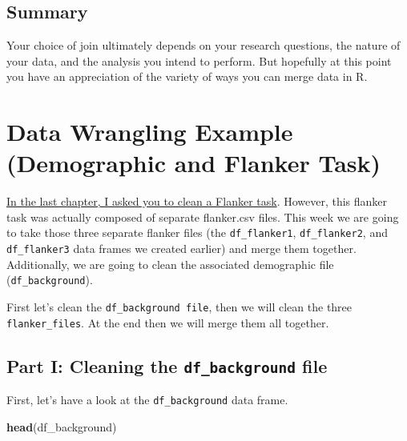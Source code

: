 \documentclass[
]{book}
\newenvironment{Shaded}{\begin{snugshade}}{\end{snugshade}}
\newcommand{\FunctionTok}[1]{\textcolor[rgb]{0.13,0.29,0.53}{\textbf{#1}}}
\newcommand{\NormalTok}[1]{#1}
\begin{document}
\hypertarget{summary-7}{%
\subsection{Summary}\label{summary-7}}

Your choice of join ultimately depends on your research questions, the nature of your data, and the analysis you intend to perform. But hopefully at this point you have an appreciation of the variety of ways you can merge data in R.

\hypertarget{data-wrangling-example-demographic-and-flanker-task}{%
\section{Data Wrangling Example (Demographic and Flanker Task)}\label{data-wrangling-example-demographic-and-flanker-task}}

\protect\hyperlink{clean-activity}{In the last chapter, I asked you to clean a Flanker task}. However, this flanker task was actually composed of separate flanker.csv files. This week we are going to take those three separate flanker files (the \texttt{df\_flanker1}, \texttt{df\_flanker2}, and \texttt{df\_flanker3} data frames we created earlier) and merge them together. Additionally, we are going to clean the associated demographic file (\texttt{df\_background}).

First let's clean the \texttt{df\_background\ file}, then we will clean the three \texttt{flanker\_files}. At the end then we will merge them all together.

\hypertarget{part-i-cleaning-the-df_background-file}{%
\subsection{\texorpdfstring{Part I: Cleaning the \texttt{df\_background} file}{Part I: Cleaning the df\_background file}}\label{part-i-cleaning-the-df_background-file}}

First, let's have a look at the \texttt{df\_background} data frame.

\begin{Shaded}
\begin{Highlighting}[]
\FunctionTok{head}\NormalTok{(df\_background)}
\end{Highlighting}
\end{Shaded}
\end{document}
